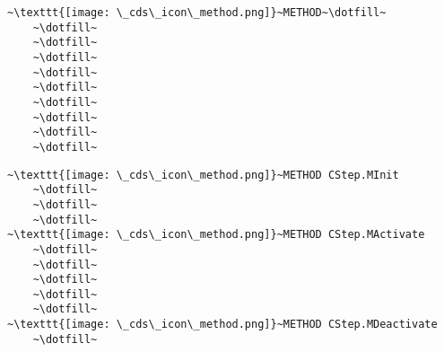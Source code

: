 \pagebreak
\begin{UPSTIactivite}
    \begin{lstlisting}[numbers=none, escapechar=~, basicstyle=\Large, language=st]
~\texttt{[image: \_cds\_icon\_method.png]}~METHOD~\dotfill~
    ~\dotfill~
    ~\dotfill~
    ~\dotfill~
    ~\dotfill~
    ~\dotfill~
    ~\dotfill~
    ~\dotfill~
    ~\dotfill~
    ~\dotfill~
\end{lstlisting}
\end{UPSTIactivite}
\begin{UPSTIactivite}
    \begin{lstlisting}[numbers=none, escapechar=~, basicstyle=\Large, language=st]
~\texttt{[image: \_cds\_icon\_method.png]}~METHOD CStep.MInit 
    ~\dotfill~
    ~\dotfill~
    ~\dotfill~
~\texttt{[image: \_cds\_icon\_method.png]}~METHOD CStep.MActivate 
    ~\dotfill~
    ~\dotfill~
    ~\dotfill~
    ~\dotfill~
    ~\dotfill~
~\texttt{[image: \_cds\_icon\_method.png]}~METHOD CStep.MDeactivate
    ~\dotfill~
    \end{lstlisting}
\end{UPSTIactivite}